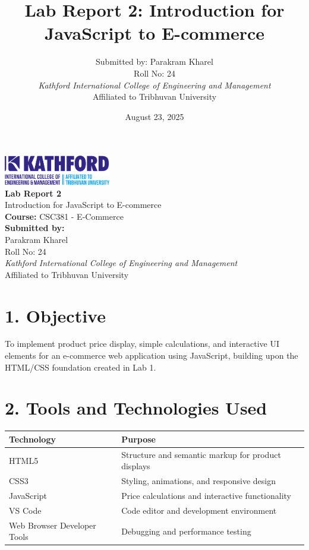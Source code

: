 \documentclass[a4paper,12pt]{article}
\title{Lab Report 2: Introduction for JavaScript to E-commerce}
\author{Submitted by: Parakram Kharel \\ Roll No: 24 \\ 
\textit{Kathford International College of Engineering and Management} \\ 
Affiliated to Tribhuvan University}
\begin{document}

\begin{titlepage}
  \begin{center}
    \vspace*{2cm}
    \includegraphics[width=0.35\textwidth]{Kath.png} \\[2cm]

    {\Huge \bfseries Lab Report 2} \\[0.5cm]
    {\Large Introduction for JavaScript to E-commerce} \\[2cm]

    {\Large \textbf{Course:} CSC381 - E-Commerce} \\[1cm]
    {\Large \textbf{Submitted by:}} \\[0.3cm]
    {\large Parakram Kharel \\ Roll No: 24} \\[2cm]

    \textit{Kathford International College of Engineering and Management} \\
    Affiliated to Tribhuvan University \\[3cm]

    \date{August 23, 2025}
    {\normalsize \@date}
  \end{center}
\end{titlepage}

\pagestyle{main}
\setlength{\parskip}{1em}

\section*{1. Objective}
To implement product price display, simple calculations, and interactive UI elements for an e-commerce web application using JavaScript, building upon the HTML/CSS foundation created in Lab 1.


\section*{2. Tools and Technologies Used}
\begin{longtable}{ll}
  \toprule
  \textbf{Technology}         & \textbf{Purpose}                                   \\
  \midrule
  HTML5                       & Structure and semantic markup for product displays \\
  CSS3                        & Styling, animations, and responsive design         \\
  JavaScript                  & Price calculations and interactive functionality   \\
  VS Code                     & Code editor and development environment            \\
  Web Browser Developer Tools & Debugging and performance testing                  \\
  \bottomrule
\end{longtable}
\end{document}
